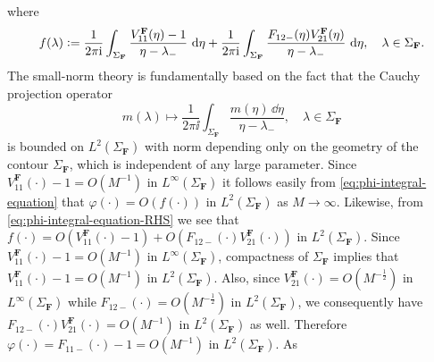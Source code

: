 where 
\begin{equation}
f(\lambda)\vcentcolon= \frac{1}{2\pi\mathrm{i}}\int_{\Sigma_\mathbf{F}}\frac{V_{11}^\mathbf{F}(\eta)-1}{\eta-\lambda_-}\,\,\mathrm{d}\eta + \frac{1}{2\pi\mathrm{i}}\int_{\Sigma_\mathbf{F}}\frac{F_{12-}(\eta)V_{21}^\mathbf{F}(\eta)}{\eta-\lambda_-}\,\,\mathrm{d}\eta,\quad\lambda\in\Sigma_\mathbf{F}.
\label{eq:phi-integral-equation-RHS}
\end{equation}
The small-norm theory is fundamentally based on the fact that the Cauchy projection operator 
\begin{equation}
m(\lambda)\mapsto\frac{1}{2\pi\ii}\int_{\Sigma_\mathbf{F}}\frac{m(\eta)\,\dd\eta}{\eta-\lambda_-},\quad\lambda\in\Sigma_\mathbf{F}
\end{equation}
is bounded on $L^2(\Sigma_\mathbf{F})$ with norm depending only on the geometry of the contour $\Sigma_\mathbf{F}$, which is independent of any large parameter.  Since 
$V_{11}^\mathbf{F}(\cdot)-1=O(M^{-1})$
in $L^\infty(\Sigma_\mathbf{F})$ it follows easily from \eqref{eq:phi-integral-equation} that $\varphi(\cdot)=O(f(\cdot))$ in $L^2(\Sigma_\mathbf{F})$ as 
$M\to\infty$.
Likewise, from \eqref{eq:phi-integral-equation-RHS} we see that $f(\cdot)=O(V^\mathbf{F}_{11}(\cdot)-1)+O(F_{12-}(\cdot)V_{21}^\mathbf{F}(\cdot))$ in $L^2(\Sigma_\mathbf{F})$.  Since 
$V^\mathbf{F}_{11}(\cdot)-1=O(M^{-1})$
in $L^\infty(\Sigma_\mathbf{F})$, compactness of $\Sigma_\mathbf{F}$ implies that 
$V^\mathbf{F}_{11}(\cdot)-1=O(M^{-1})$
in $L^2(\Sigma_\mathbf{F})$.  Also, since 
$V_{21}^\mathbf{F}(\cdot)=O(M^{-\frac{1}{2}})$
in $L^\infty(\Sigma_\mathbf{F})$ while 
$F_{12-}(\cdot)=O(M^{-\frac{1}{2}})$
in $L^2(\Sigma_\mathbf{F})$, we consequently have 
$F_{12-}(\cdot)V_{21}^\mathbf{F}(\cdot)=O(M^{-1})$
in $L^2(\Sigma_\mathbf{F})$ as well.  Therefore 
$\varphi(\cdot)=F_{11-}(\cdot)-1=O(M^{-1})$
in $L^2(\Sigma_\mathbf{F})$.  As 
